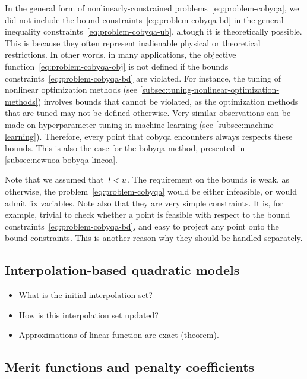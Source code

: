 
In the general form of nonlinearly-constrained problems~\cref{eq:problem-cobyqa}, we did not include the bound constraints~\cref{eq:problem-cobyqa-bd} in the general inequality constraints~\cref{eq:problem-cobyqa-ub}, altough it is theoretically possible.
This is because they often represent inalienable physical or theoretical restrictions.
In other words, in many applications, the objective function~\cref{eq:problem-cobyqa-obj} is not defined if the bounds constraints~\cref{eq:problem-cobyqa-bd} are violated.
For instance, the tuning of nonlinear optimization methods (see \cref{subsec:tuning-nonlinear-optimization-methods}) involves bounds that cannot be violated, as the optimization methods that are tuned may not be defined otherwise.
Very similar observations can be made on hyperparameter tuning in machine learning (see \cref{subsec:machine-learning}).
Therefore, every point that \gls{cobyqa} encounters always respects these bounds.
This is also the case for the \gls{bobyqa} method, presented in \cref{subsec:newuoa-bobyqa-lincoa}.

Note that we assumed that~$l < u$.
The requirement on the bounds is weak, as otherwise, the problem~\cref{eq:problem-cobyqa} would be either infeasible, or would admit fix variables.
Note also that they are very simple constraints.
It is, for example, trivial to check whether a point is feasible with respect to the bound constraints~\cref{eq:problem-cobyqa-bd}, and easy to project any point onto the bound constraints.
This is another reason why they should be handled separately.

\subsection{Interpolation-based quadratic models}
\label{subsec:cobyqa-models}

\begin{itemize}
    \item What is the initial interpolation set?
    \item How is this interpolation set updated?
    \item Approximations of linear function are exact (theorem).
\end{itemize}

\subsection{Merit functions and penalty coefficients}
\label{subsec:cobyqa-merit-function}

